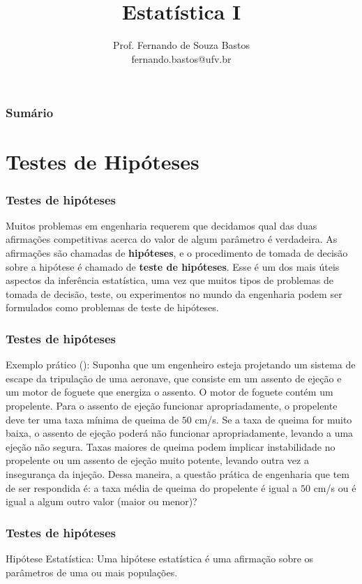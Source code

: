\documentclass[14pt,aspectratio=1610]{beamer}
\title{Estatística I}
\author{Prof. Fernando de Souza Bastos\texorpdfstring{\\ fernando.bastos@ufv.br}{}}
\institute{Departamento de Estatística\texorpdfstring{\\ Universidade Federal de Viçosa}{}\texorpdfstring{\\ Campus UFV - Viçosa}{}}
\date{}
\begin{document}


\frame{\titlepage}

\begin{frame}{}
\frametitle{\bf Sumário}
\tableofcontents
\end{frame}

\section{Testes de Hipóteses}
\begin{frame}{}
\frametitle{Testes de hipóteses}
\begin{block}{}
\nocite{Apostila}
\justifying
Muitos problemas em engenharia requerem que decidamos qual das duas afirmações competitivas acerca do valor de algum parâmetro é verdadeira. As afirmações 
são chamadas de \textbf{hipóteses}, e o procedimento de tomada de decisão sobre a hipótese é chamado de \textbf{teste de hipóteses}. Esse é um dos mais úteis 
aspectos da inferência estatística, uma vez que muitos tipos de problemas de tomada de decisão, teste, ou experimentos no mundo da engenharia podem ser formulados 
como problemas de teste de hipóteses.
\end{block}
\end{frame}

\begin{frame}{}
\frametitle{Testes de hipóteses}
\begin{block}{Exemplo prático (\cite{montgomery2016}):}
\justifying
Suponha que um engenheiro esteja projetando um sistema de escape da tripulação de uma aeronave, que consiste em um assento de ejeção e um motor de foguete 
que energiza o assento. O motor de foguete contém um propelente. Para o assento de ejeção funcionar apropriadamente, o propelente deve ter uma taxa mínima de 
queima de $50$ cm/s. Se a taxa de queima for muito baixa, o assento de ejeção poderá não funcionar apropriadamente, levando a uma ejeção não segura. Taxas maiores 
de queima podem implicar instabilidade no propelente ou um assento de ejeção muito potente, levando outra vez a insegurança da injeção. Dessa maneira, a questão 
prática de engenharia que tem de ser respondida é: a taxa média de queima do propelente é igual a $50$ cm/s ou é igual a algum outro valor 
(maior ou menor)?
\end{block}
\end{frame}

\begin{frame}{}
\frametitle{Testes de hipóteses}
\begin{block}{Hipótese Estatística:}
Uma hipótese estatística é uma afirmação sobre os parâmetros de uma ou mais populações.
 \end{block}
\end{frame}
\end{document}
